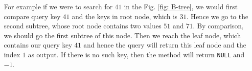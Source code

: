 \begin{mscexample}
For example if we were to search for $41$ in the Fig. \ref{fig: B-tree}, we would first compare query key $41$ and the keys in root node, which is $31$. Hence we go to the second subtree, whose root node contains two values $51$ and $71$. By comparison, we should go the first subtree of this node. Then we reach the leaf node, which contains our query key $41$ and hence the query will return this leaf node and the index $1$ as output. If there is no such key, then the method will return \texttt{NULL} and $-1$.
\end{mscexample}